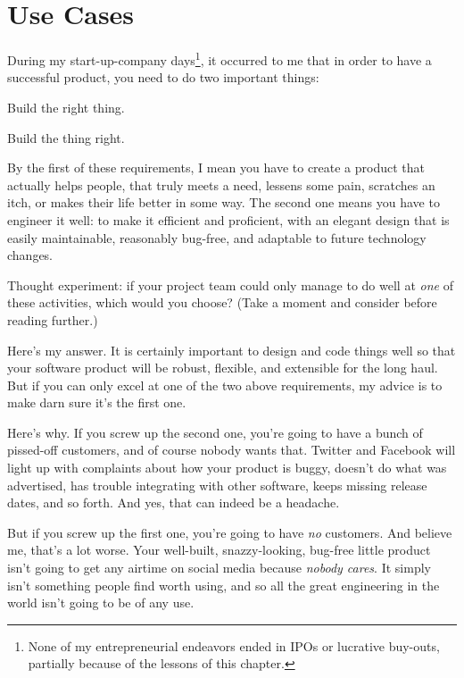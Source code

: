 
\chapter{Use Cases}

During my start-up-company days\footnote{None of my entrepreneurial endeavors
ended in IPOs or lucrative buy-outs, partially because of the lessons of this
chapter.}, it occurred to me that in order to have a successful product, you
need to do two important things:

\begin{compactenum}
\item Build the right thing.
\item Build the thing right.
\end{compactenum}

By the first of these requirements, I mean you have to create a product that
actually helps people, that truly meets a need, lessens some pain, scratches
an itch, or makes their life better in some way. The second one means you have
to engineer it well: to make it efficient and proficient, with an elegant
design that is easily maintainable, reasonably bug-free, and adaptable to
future technology changes.

Thought experiment: if your project team could only manage to do well at
\textit{one} of these activities, which would you choose? (Take a moment and
consider before reading further.)

Here's my answer. It is certainly important to design and code things well so
that your software product will be robust, flexible, and extensible for the
long haul. But if you can only excel at one of the two above requirements, my
advice is to make darn sure it's the first one.

Here's why. If you screw up the second one, you're going to have a bunch of
pissed-off customers, and of course nobody wants that. Twitter and Facebook
will light up with complaints about how your product is buggy, doesn't do what
was advertised, has trouble integrating with other software, keeps missing
release dates, and so forth. And yes, that can indeed be a headache.

But if you screw up the first one, you're going to have \textit{no} customers.
And believe me, that's a lot worse. Your well-built, snazzy-looking, bug-free
little product isn't going to get any airtime on social media because
\textit{nobody cares}. It simply isn't something people find worth using, and
so all the great engineering in the world isn't going to be of any use.

